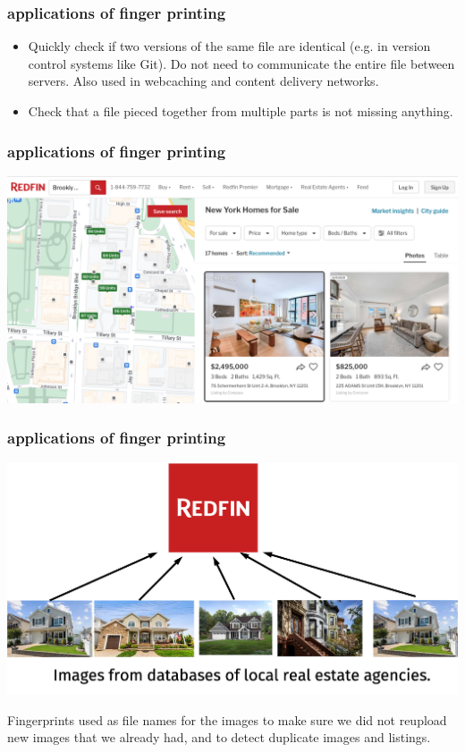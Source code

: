 \documentclass[handout,compress]{beamer}
\begin{document}
\begin{frame}[t]
	\frametitle{applications of finger printing}
	\begin{itemize} 
		\item Quickly check if two versions of the same file are identical (e.g. in version control systems like Git). Do not need to communicate the entire file between servers. Also used in webcaching and content delivery networks. 
		\item Check that a file pieced together from multiple parts is not missing anything. 
	\end{itemize}
	
\end{frame}

\begin{frame}[t]
	\frametitle{applications of finger printing}
	\begin{center}
		\includegraphics[width=\textwidth]{redfin_1.png}
	\end{center}
\end{frame}

\begin{frame}[t]
	\frametitle{applications of finger printing}
	\begin{center}
		\includegraphics[width=\textwidth]{redfin_2.png}
	\end{center}
	
	Fingerprints used as file names for the images to make sure we did not reupload new images that we already had, and to detect duplicate images and listings.
\end{frame}
\end{document}
